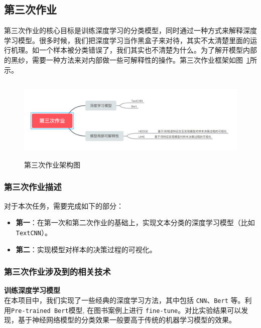 \subsection{第三次作业}

\noindent 第三次作业的核心目标是训练深度学习的分类模型，同时通过一种方式来解释深度学习模型。很多时候，我们把深度学习当作黑盒子来对待，其实不太清楚里面的运行机理。如一个样本被分类错误了，我们其实也不清楚为什么。为了解开模型内部的黑纱，需要一种方法来对内部做一些可解释性的操作。第三次作业框架如图~\ref{fig:book_task3_mindmap}所示。

\begin{figure}[ht]
 \centering
 \includegraphics[height=4cm]{images/book_task3_mindmap}
 \caption{第三次作业架构图}
 \label{fig:book_task3_mindmap}
\end{figure}
\subsubsection{第三次作业描述}

\noindent 对于本次任务，需要完成如下的部分：
\begin{itemize}
\item \textbf{第一}：在第一次和第二次作业的基础上，实现文本分类的深度学习模型（比如 \texttt{TextCNN}）。
\item \textbf{第二}：实现模型对样本的决策过程的可视化。
\end{itemize}

\subsubsection{第三次作业涉及到的相关技术}

\noindent \textbf{训练深度学习模型}\\

\noindent 在本项目中，我们实现了一些经典的深度学习方法，其中包括 \texttt{CNN}、\texttt{Bert} 等。利用\texttt{Pre-trained Bert}模型, 在图书案例上进行 \texttt{fine-tune}。对比实验结果可以发现，基于神经网络模型的分类效果一般要高于传统的机器学习模型的效果。\\

